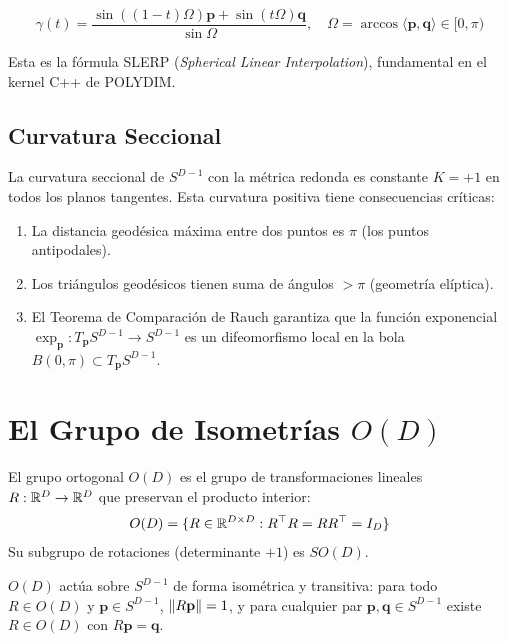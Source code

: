 \begin{equation}
\gamma(t) = \frac{\sin((1-t)\Omega) \mathbf{p} + \sin(t\Omega) \mathbf{q}}{\sin \Omega}, \quad
\Omega = \arccos\langle \mathbf{p}, \mathbf{q} \rangle \in [0, \pi)
\label{eq:slerp}
\end{equation}

Esta es la fórmula SLERP (\textit{Spherical Linear Interpolation}), fundamental
en el kernel C++ de POLYDIM.

\subsection{Curvatura Seccional}

La curvatura seccional de $S^{D-1}$ con la métrica redonda es constante $K = +1$
en todos los planos tangentes. Esta curvatura positiva tiene consecuencias críticas:

\begin{enumerate}
\item La distancia geodésica máxima entre dos puntos es $\pi$ (los puntos antipodales).
\item Los triángulos geodésicos tienen suma de ángulos $> \pi$ (geometría elíptica).
\item El Teorema de Comparación de Rauch garantiza que la función exponencial
$\exp_{\mathbf{p}}: T_{\mathbf{p}} S^{D-1} \to S^{D-1}$ es un difeomorfismo
local en la bola $B(0, \pi) \subset T_{\mathbf{p}} S^{D-1}$.
\end{enumerate}

\section{El Grupo de Isometrías $O(D)$}

\begin{definition}
El grupo ortogonal $O(D)$ es el grupo de transformaciones lineales $R: \mathbb{R}^D \to \mathbb{R}^D$
que preservan el producto interior:
\begin{equation}
O(D) = \{R \in \mathbb{R}^{D \times D} : R^\top R = R R^\top = I_D\}
\end{equation}
Su subgrupo de rotaciones (determinante $+1$) es $SO(D)$.
\end{definition}

\begin{proposition}
$O(D)$ actúa sobre $S^{D-1}$ de forma isométrica y transitiva: para todo
$R \in O(D)$ y $\mathbf{p} \in S^{D-1}$, $\norm{R\mathbf{p}} = 1$, y para
cualquier par $\mathbf{p}, \mathbf{q} \in S^{D-1}$ existe $R \in O(D)$ con
$R\mathbf{p} = \mathbf{q}$.
\end{proposition}

